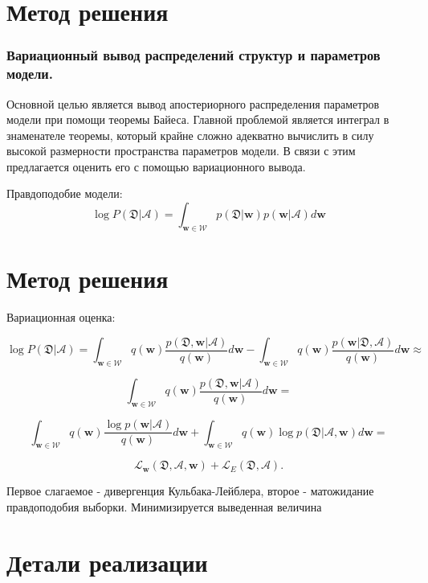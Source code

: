 \documentclass[9pt]{beamer}
\begin{document}
	\section{Метод решения}
	
	\begin{frame}
		\frametitle{Вариационный вывод распределений структур и параметров модели.}
		Основной целью является вывод апостериорного распределения параметров модели при помощи теоремы Байеса. Главной проблемой является интеграл в знаменателе теоремы, который крайне сложно адекватно вычислить в силу высокой размерности пространства параметров модели. В связи с этим предлагается оценить его с помощью вариационного вывода.
		
		\medskip
		
		Правдоподобие модели:
		$$\log P(\mathfrak{D}|\mathcal{A}) = \int_{\mathbf{w}\in\mathcal{W}}p(\mathfrak{D}|\mathbf{w})p(\mathbf{w}|\mathcal{A})d\mathbf{w}$$
	\end{frame}
	
	\section{Метод решения}
	
	\begin{frame}
		Вариационная оценка:
		
		$$\log P(\mathfrak{D}|\mathcal{A}) = \int_{\mathbf{w}\in\mathcal{W}}q(\mathbf{w})\frac{p(\mathfrak{D}, \mathbf{w}|\mathcal{A})}{q(\mathbf{w})}d\mathbf{w} - \int_{\mathbf{w}\in\mathcal{W}}q(\mathbf{w})\frac{p(\mathbf{w}|\mathfrak{D}, 
			\mathcal{A})}{q(\mathbf{w})}d\mathbf{w} \approx$$ 
		
		$$\int_{\mathbf{w}\in\mathcal{W}}q(\mathbf{w})\frac{p(\mathfrak{D}, \mathbf{w}|\mathcal{A})}{q(\mathbf{w})}d\mathbf{w} = $$
		
		$$\int_{\mathbf{w}\in\mathcal{W}}q(\mathbf{w})\frac{\log p(\mathbf{w}|\mathcal{A})}{q(\mathbf{w})}d\mathbf{w} + \int_{\mathbf{w}\in\mathcal{W}}q(\mathbf{w})\log p(\mathfrak{D}|\mathcal{A}, \mathbf{w})d\mathbf{w}=$$
		
		$$\mathcal{L}_{\mathbf{w}}(\mathfrak{D}, \mathcal{A}, \mathbf{w}) + \mathcal{L}_{E}(\mathfrak{D}, \mathcal{A}).$$
		
		Первое слагаемое - дивергенция Кульбака-Лейблера, второе - матожидание правдоподобия выборки. Минимизируется выведенная величина
	\end{frame}
	
	\section{Детали реализации}
	
\end{document}
